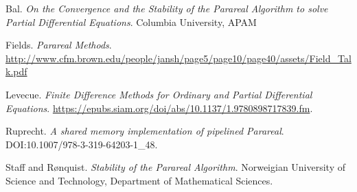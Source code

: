 \begin{thebibliography}{9}
Bal.
\textit{On the Convergence and the Stability of the Parareal Algorithm to solve
Partial Differential Equations}.
Columbia University, APAM

Fields.
\textit{Parareal Methods}.
\url{http://www.cfm.brown.edu/people/jansh/page5/page10/page40/assets/Field_Talk.pdf}

Levecue.
\textit{Finite Difference Methods for Ordinary and Partial Differential
  Equations}.
\url{https://epubs.siam.org/doi/abs/10.1137/1.9780898717839.fm}.

Ruprecht.
\textit{A shared memory implementation of pipelined Parareal}.
DOI:10.1007/978-3-319-64203-1_48.

Staff and R{\o}nquist.
\textit{Stability of the Parareal Algorithm}.
Norweigian University of Science and Technology, Department of Mathematical
Sciences.


\end{thebibliography}
